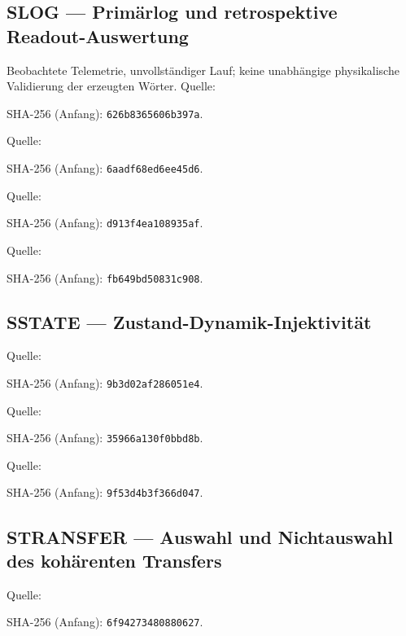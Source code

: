 \documentclass[11pt,a4paper,oneside,parskip=half,headings=normal,numbers=noenddot,bibliography=totoc]{scrreprt}
\begin{document}
\subsection*{SLOG — Primärlog und retrospektive Readout-Auswertung}\label{s:LOG}
Beobachtete Telemetrie, unvollständiger Lauf; keine unabhängige physikalische Validierung der erzeugten Wörter.
Quelle: \par{\footnotesize SHA-256 (Anfang): \texttt{626b8365606b397a}.}\par
Quelle: \par{\footnotesize SHA-256 (Anfang): \texttt{6aadf68ed6ee45d6}.}\par
Quelle: \par{\footnotesize SHA-256 (Anfang): \texttt{d913f4ea108935af}.}\par
Quelle: \par{\footnotesize SHA-256 (Anfang): \texttt{fb649bd50831c908}.}\par
\subsection*{SSTATE — Zustand-Dynamik-Injektivität}\label{s:STATE}
Quelle: \par{\footnotesize SHA-256 (Anfang): \texttt{9b3d02af286051e4}.}\par
Quelle: \par{\footnotesize SHA-256 (Anfang): \texttt{35966a130f0bbd8b}.}\par
Quelle: \par{\footnotesize SHA-256 (Anfang): \texttt{9f53d4b3f366d047}.}\par
\subsection*{STRANSFER — Auswahl und Nichtauswahl des kohärenten Transfers}\label{s:TRANSFER}
Quelle: \par{\footnotesize SHA-256 (Anfang): \texttt{6f94273480880627}.}\par
\end{document}
